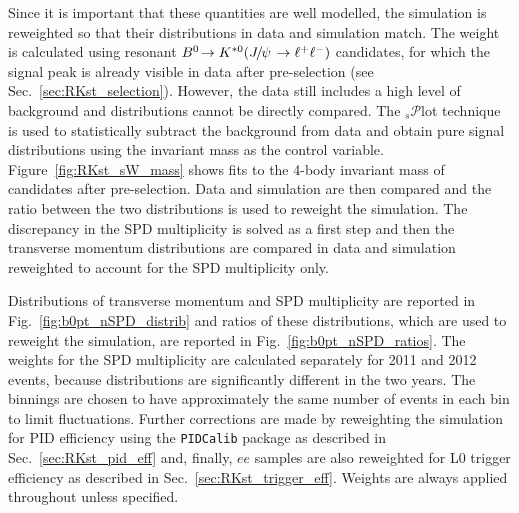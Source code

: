 Since it is important that these quantities are well modelled, the simulation is
reweighted so that their distributions in data and simulation match.
The weight is calculated using resonant $\decay{\Bz}{\Kstarz(\jpsi\to\ll)}$ candidates, for which the signal peak
is already visible in data after pre-selection (see Sec.~\ref{sec:RKst_selection}). However, the data still includes
a high level of background and distributions cannot be directly compared.
The $_s\mathcal{P}$lot technique~\cite{sPlot} is used to statistically subtract the background from
data and obtain pure signal distributions using the invariant mass as the control variable.
Figure~\ref{fig:RKst_sW_mass} shows fits to the 4-body invariant mass of candidates after pre-selection.
Data and simulation are then compared and the ratio between the two distributions is used to reweight
the simulation. The discrepancy in the SPD multiplicity is solved as a first step and then the \Bz transverse momentum 
distributions are compared in data and simulation reweighted to account for the SPD multiplicity only.

Distributions of \Bz transverse momentum and SPD multiplicity are reported in Fig.~\ref{fig:b0pt_nSPD_distrib}
and ratios of these distributions, which are used to reweight the simulation, are reported in 
Fig.~\ref{fig:b0pt_nSPD_ratios}. The weights for the SPD multiplicity are calculated
separately for 2011 and 2012 events, because distributions are significantly different
in the two years. The binnings are chosen to have approximately 
the same number of events in each bin to limit fluctuations.
Further corrections are made by reweighting the simulation for PID efficiency using the
\verb!PIDCalib! package as described in Sec.~\ref{sec:RKst_pid_eff} and, finally, 
$ee$ samples are also reweighted for L0 trigger efficiency as described in Sec.~\ref{sec:RKst_trigger_eff}.
Weights are always applied throughout unless specified.

